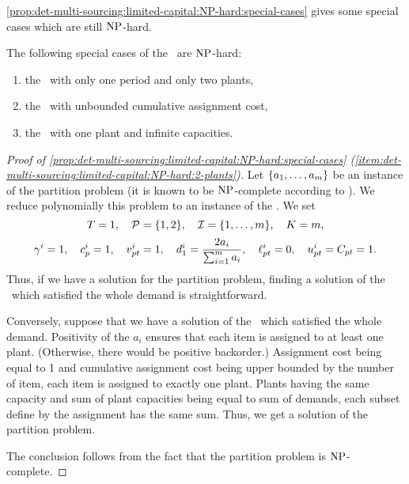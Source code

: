 \cref{prop:det-multi-sourcing:limited-capital:NP-hard:special-cases} gives some special cases which are still $\operatorname{NP}$-hard.



\begin{prop}\label{prop:det-multi-sourcing:limited-capital:NP-hard:special-cases}
  The following special cases of the \tbc\ are $\operatorname{NP}$-hard:
  \begin{enumerate}
    \item\label{item:det-multi-sourcing:limited-capital:NP-hard:2-plants}
    the \tbc\ with only one period and only two plants,
    \item\label{item:det-multi-sourcing:limited-capital:NP-hard:unbounded-assignment-cost}
    the \tbc\ with unbounded cumulative assignment cost,
    \item\label{item:det-multi-sourcing:limited-capital:NP-hard:infinite-capacities}
    the \tbc\ with one plant and infinite capacities.
  \end{enumerate}
\end{prop}


\begin{proof}[Proof of \cref{prop:det-multi-sourcing:limited-capital:NP-hard:special-cases} (\cref{item:det-multi-sourcing:limited-capital:NP-hard:2-plants})]
Let $\crbracket{a_1,\ldots,a_m}$ be an instance of the partition problem (it is known to be $\operatorname{NP}$-complete according to \cite{Garey1979}).
We reduce polynomially this problem to an instance of the \tbc.
We set
$$
  \horizon=1
  ,\quad
  \plants=\crbracket{1,2}
  ,\quad
  \REF=\range[1]{m}
  ,\quad
  \capital = m,
$$
$$
  \gamma^i=1
  ,\quad
  c_p^i=1
  ,\quad
  v_{pt}^i=1
  ,\quad
  d_1^i=\frac{2a_i}{\sum_{i=1}^{m}a_i}
  ,\quad
  \ell_{pt}^i=0
  ,\quad
  u_{pt}^i=C_{pt}=1.
$$
Thus, if we have a solution for the partition problem, finding a solution of the \tbc\ which satisfied the whole demand is straightforward.

Conversely, suppose that we have a solution of the \tbc\ which satisfied the whole demand.
Positivity of the $a_i$ ensures that each item is assigned to at least one plant.
(Otherwise, there would be positive backorder.)
Assignment cost being equal to 1 and cumulative assignment cost being upper bounded by the number of item, each item is assigned to exactly one plant.
Plants having the same capacity and sum of plant capacities being equal to sum of demands, each subset define by the assignment has the same sum.
Thus, we get a solution of the partition problem.

The conclusion follows from the fact that the partition problem is $\operatorname{NP}$-complete.
\end{proof}



